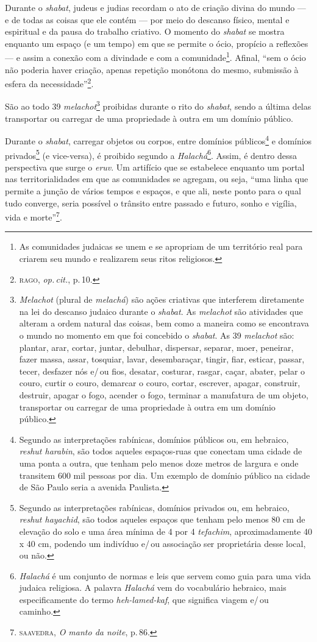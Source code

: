 Durante o \emph{shabat}, judeus e judias recordam o ato de criação
divina do mundo --- e de todas as coisas que ele contém --- por meio do
descanso físico, mental e espiritual e da pausa do trabalho criativo. O
momento do \emph{shabat} se mostra enquanto um espaço (e
um tempo) em que se permite o ócio, propício a reflexões --- e assim a conexão com
a divindade e com a comunidade\footnote{As comunidades judaicas se unem
  e se apropriam de um território real para criarem seu mundo e
  realizarem seus ritos religiosos.}. Afinal, ``sem o ócio não
poderia haver criação, apenas repetição monótona do mesmo, submissão à
esfera da necessidade''\footnote{\textsc{rago}, \emph{op.\,cit.}, p.\,10.}.

São ao todo 39 \emph{melachot}\footnote{\emph{Melachot}
  (plural de \emph{melachá}) são ações criativas que interferem
  diretamente na lei do descanso judaico durante o \emph{shabat}. As
  \emph{melachot} são atividades que alteram a ordem natural das coisas,
  bem como a maneira como se encontrava o mundo no momento em que
  foi concebido o \emph{shabat}. As 39 \emph{melachot} são: plantar, arar, cortar, juntar, debulhar,
dispersar, separar, moer, peneirar, fazer massa, assar, tosquiar, lavar,
desembaraçar, tingir, fiar, esticar, passar, tecer, desfazer nós e/\,ou
fios, desatar, costurar, rasgar, caçar, abater, pelar o couro, curtir o
couro, demarcar o couro, cortar, escrever, apagar, construir, destruir,
apagar o fogo, acender o fogo, terminar a manufatura de um objeto,
transportar ou carregar de uma propriedade à outra em um domínio
público.} proibidas durante o rito do
\emph{shabat}, sendo a última delas transportar ou carregar de uma propriedade à outra em um domínio público.

Durante o \emph{shabat}, carregar objetos ou corpos, entre domínios
públicos\footnote{Segundo as interpretações rabínicas, domínios públicos
  ou, em hebraico, \emph{reshut harabin}, são todos aqueles espaços-ruas
  que conectam uma cidade de uma ponta a outra, que tenham pelo menos
  doze metros de largura e onde transitem 600 mil pessoas por dia. Um
  exemplo de domínio público na cidade de São Paulo seria a avenida
  Paulista.} e domínios privados\footnote{Segundo as interpretações
  rabínicas, domínios privados ou, em hebraico, \emph{reshut hayachid},
  são todos aqueles espaços que tenham pelo menos 80 cm de elevação do
  solo e uma área mínima de 4 por 4 \emph{tefachim}, aproximadamente 40
  x 40 cm, podendo um indivíduo e/\,ou associação ser proprietária desse
  local, ou não.} (e vice-versa), é proibido segundo a
\emph{Halachá}\footnote{\emph{Halachá} é um conjunto de normas e leis
  que servem como guia para uma vida judaica religiosa. A palavra
  \emph{Halachá} vem do vocabulário hebraico, mais especificamente do
  termo \emph{heh-lamed-kaf}, que significa viagem e/\,ou caminho.}.
Assim, é dentro dessa perspectiva que surge o \emph{eruv}. Um artifício
que se estabelece enquanto um portal nas territorialidades em que as
comunidades se agregam, ou seja, ``uma linha que permite a junção
de vários tempos e espaços, e que ali, neste ponto para o qual tudo
converge, seria possível o trânsito entre passado e futuro, sonho e
vigília, vida e morte''\footnote{\textsc{saavedra}, \emph{O manto da noite}, p.\,86.}.

